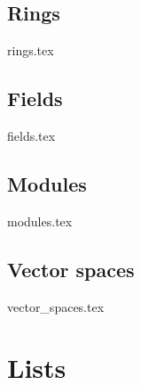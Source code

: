 \documentclass[numbers=endperiod, bibliography=totocnumbered]{scrartcl}
\begin{document}
\subsection{Rings}\label{sec:rings}
{rings.tex}
\subsection{Fields}\label{sec:fields}
{fields.tex}
\subsection{Modules}\label{sec:modules}
{modules.tex}
\subsection{Vector spaces}\label{sec:vector_spaces}
{vector_spaces.tex}

\section{Lists}

\listofaoc\label{list:aoc}
\listoflem\label{list:lem}
\listofusc\label{list:usc}

\raggedright
\printbibliography
\end{document}
